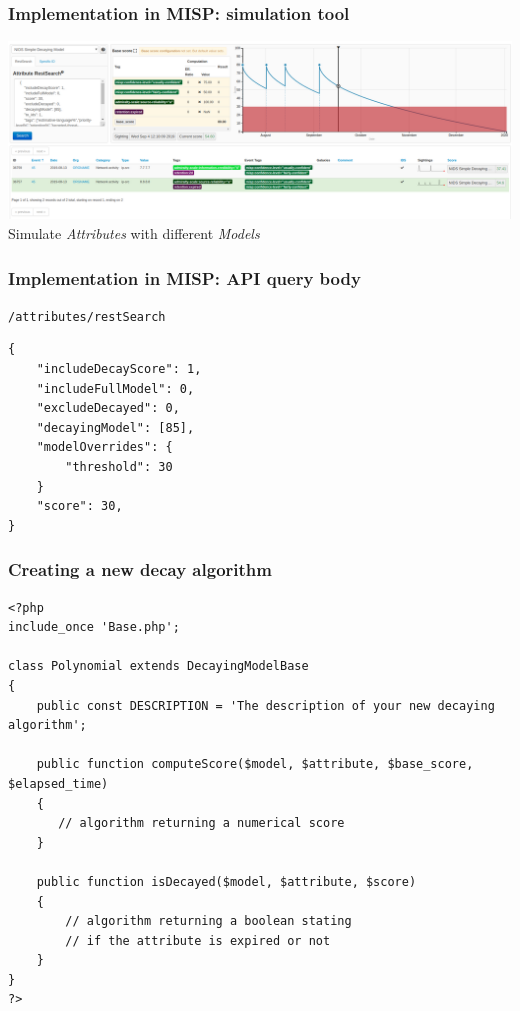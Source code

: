 \begin{frame}
    \frametitle{Implementation in MISP: simulation tool}
    \includegraphics[width=1.00\linewidth]{pics/decaying-simulation.png}
    Simulate \textit{Attributes} with different \textit{Models}
\end{frame}

\begin{frame}[fragile]
    \frametitle{Implementation in MISP: API query body}
    \texttt{/attributes/restSearch}
    \begin{lstlisting}
{
    "includeDecayScore": 1,
    "includeFullModel": 0,
    "excludeDecayed": 0,
    "decayingModel": [85],
    "modelOverrides": {
        "threshold": 30
    }
    "score": 30,
}
    \end{lstlisting}
\end{frame}

\lstset{language=PHP}
\begin{frame}[fragile]
    \frametitle{Creating a new decay algorithm}
    \lstset{basicstyle=\scriptsize}
    \begin{lstlisting}
<?php
include_once 'Base.php';

class Polynomial extends DecayingModelBase
{
    public const DESCRIPTION = 'The description of your new decaying algorithm';

    public function computeScore($model, $attribute, $base_score, $elapsed_time)
    {
       // algorithm returning a numerical score
    }

    public function isDecayed($model, $attribute, $score)
    {
        // algorithm returning a boolean stating
        // if the attribute is expired or not
    }
}
?>
    \end{lstlisting}
\end{frame}

